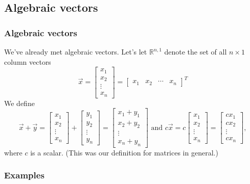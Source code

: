 \documentclass[11pt,t]{beamer}
\newcommand{\R}{\mathbb{R}}
\begin{document}
\subsection{Algebraic vectors}
\begin{frame}
\frametitle{Algebraic vectors}
We've already met algebraic vectors. Let's let $\R^{n,1}$ denote the set of all $n\times 1$ column vectors
\[
\vec{x} = \begin{bmatrix}
x_1\\x_2\\\vdots \\x_n
\end{bmatrix}=\begin{bmatrix}
x_1&x_2&\cdots &x_n\end{bmatrix}^T
\]
We define
\[
\vec{x}+\vec{y} = \begin{bmatrix}
x_1\\x_2\\\vdots \\x_n
\end{bmatrix}+\begin{bmatrix}
y_1\\y_2\\\vdots \\y_n
\end{bmatrix} = \begin{bmatrix}
x_1+y_1\\x_2+y_2\\\vdots \\x_n+y_n
\end{bmatrix} \text{ and } c\vec{x}=c\begin{bmatrix}
x_1\\x_2\\\vdots \\x_n
\end{bmatrix}=\begin{bmatrix}
cx_1\\cx_2\\\vdots \\cx_n
\end{bmatrix},
\]
where $c$ is a scalar. (This was our definition for matrices in general.)
\end{frame}
\begin{frame}
\frametitle{Examples}
\end{frame}
\end{document}
